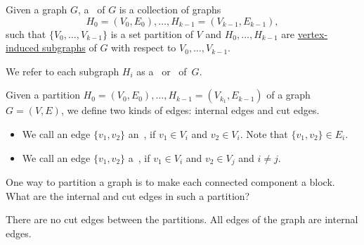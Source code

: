 \begin{definition}
\label{def:graphcon::intro::prelim::graph-partition}
Given a graph $G$, 
%
a~ of $G$ is a collection of graphs
%
\[
H_0 = (V_0, E_0), \ldots, H_{k-1} = (V_{k-1}, E_{k-1}),
\]
%
such that 
%
%
$\{V_0, \ldots, V_{k-1}\}$ is a set partition of $V$
and 
%
$H_0, \ldots, H_{k-1}$ 
%
are 
%
\href{def:bg::graphs::subgraph::vi}{vertex-induced subgraphs}
%
of $G$ with respect to $V_0, \ldots, V_{k-1}$.
%

We refer to each subgraph $H_i$ as a~ or~ of~$G$.
\end{definition}
%


\begin{definition}
\label{def:graphcon::intro::prelim::edges}
Given a partition $H_0 = (V_0, E_0), \ldots, H_{k-1} = (V_{k_1}, E_{k-1})$
of a graph $G = (V, E)$,
%
we define two kinds of edges: internal edges and cut edges.
%

\begin{itemize}

\item

We call an edge $\{v_1,v_2\}$ an~, if $v_1\in V_i$
and $v_2 \in V_i$.
%
Note that $\{v_1, v_2\} \in E_i$.
%

\item
We call an edge $\{v_1, v_2\}$ a~, if $v_1\in V_i$
and $v_2 \in V_j$  and $i \not= j$.
%
\end{itemize}

\end{definition}


\begin{flex}
\begin{exercise}
One way to partition a graph is to make each connected component a
block. What are the internal and cut edges in such a partition?
\end{exercise}
\begin{solution}
There are no cut edges between the partitions. 
%
All edges of the graph are internal edges.
\end{solution}
\end{flex}

